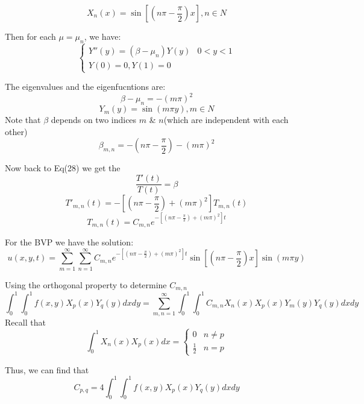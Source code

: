 \documentclass[12pt]{article} %
\begin{document}
\begin{equation}
X_{n}(x) = \sin[(n\pi- \frac{\pi}{2})x], n\in N
\end{equation}\par
Then for each $\mu = \mu_{n}$, we have:
\begin{equation}
\left\{
\begin{array}{lll}
Y''(y) = (\beta-\mu_{n}) Y(y) & 0<y<1\\
Y(0) = 0, Y(1) =0 
\end{array}
\right.
\end{equation}\par
The eigenvalues and the eigenfucntions are:
$$
\beta -\mu_{n} = -(m\pi)^{2}
$$
$$
Y_{m}(y) = \sin(m\pi y), m \in N
$$
Note that $\beta$ depends on two indices $m$ \& $n$(which are independent with each other)
$$
\beta_{m, n} = -(n\pi- \frac{\pi}{2}) - (m\pi)^{2}
$$\par
Now back to Eq(28) we get the
$$
\frac{T'(t)}{T(t)}= \beta
$$
$$
T'_{m, n}(t) = -[(n\pi- \frac{\pi}{2})+ (m\pi)^{2}]T_{m, n}(t)
$$
\begin{equation}
T_{m, n}(t) = C_{m, n}e^{ -[(n\pi- \frac{\pi}{2})+ (m\pi)^{2}]t}
\end{equation}\par
For the BVP we have the solution:
\begin{equation}
u(x, y, t) = \sum_{m=1}^{\infty}\sum_{n=1}^{\infty} C_{m, n}e^{ -[(n\pi- \frac{\pi}{2})+ (m\pi)^{2}]t}\sin[(n\pi- \frac{\pi}{2})x] \sin(m\pi y)
\end{equation}\par
Using the orthogonal property to determine $C_{m, n}$
$$
\int_{0}^{1}\int_{0}^{1}f(x, y)X_{p}(x)Y_{q}(y)dxdy =
\sum_{m, n=1}^{\infty}\int_{0}^{1}\int_{0}^{1}C_{m, n}X_{n}(x)X_{p}(x)Y_{m}(y)Y_{q}(y)dxdy
$$
Recall that 
$$
\int_{0}^{1}X_{n}(x)X_{p}(x)dx =\left\{
\begin{array}{lll}
0 &n\neq p \\
\frac{1}{2} & n=p
\end{array}\right.
$$\par
Thus, we can find that
$$
C_{p, q} = 4 \int_{0}^{1}\int_{0}^{1}f(x, y)X_{p}(x)Y_{q}(y)dxdy
$$
\end{document}
